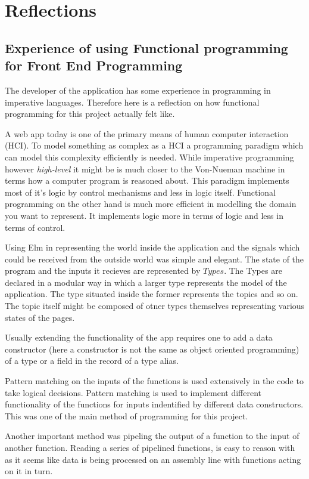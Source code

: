 
\section{Reflections}
\subsection{Experience of using Functional programming for Front End Programming} 

The developer of the application has some experience in programming in
imperative languages. Therefore here is a reflection on how functional
programming for this project actually felt like. 

A web app today is one of the primary means of human computer interaction
(HCI). To model something as complex as a HCI a programming paradigm which can
model this complexity efficiently is needed.  While imperative programming
however \emph{high-level} it might be is much closer to the Von-Nueman machine
in terms how a computer program is reasoned about. This paradigm implements
most of it's logic by control mechanisms and less in logic itself. Functional
programming on the other hand is much more efficient in modelling the domain
you want to represent. It implements logic more in terms of logic and less in
terms of control.

Using Elm in representing the world inside the application and the signals
which could be received from the outside world was simple and elegant. The
state of the program and the inputs it recieves are represented by $Types$.
The Types are declared in a modular way in which a larger type represents the
model of the application. The type situated inside the former represents the
topics and so on. The topic itself might be composed of otner types themselves
representing various states of the pages.

Usually extending the functionality of the app requires one to add a data
constructor (here a constructor is not the same as object oriented programming)
of a type or a field in the record of a type alias.

Pattern matching on the inputs of the functions is used extensively in the code
to take logical decisions. Pattern matching is used to implement different
functionality of the functions for inputs indentified by different data
constructors. This was one of the main method of programming for this project.

Another important method was pipeling the output of a function to the input of
another function. Reading a series of pipelined functions, is easy to reason
with as it seems like data is being processed on an assembly line with
functions acting on it in turn.
